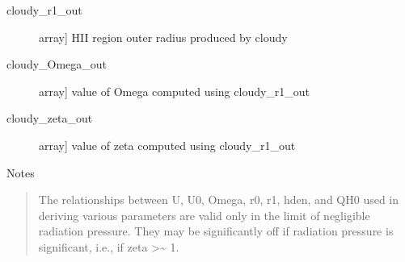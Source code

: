 \documentclass[letterpaper,10pt,english]{sphinxmanual}
\begin{document}
\begin{fulllineitems}
\begin{description}
\begin{description}
\item[{cloudy\_r1\_out}] \leavevmode{[}array{]}
HII region outer radius produced by cloudy

\item[{cloudy\_Omega\_out}] \leavevmode{[}array{]}
value of Omega computed using cloudy\_r1\_out

\item[{cloudy\_zeta\_out}] \leavevmode{[}array{]}
value of zeta computed using cloudy\_r1\_out

\end{description}

\end{description}

Notes
\begin{quote}

The relationships between U, U0, Omega, r0, r1, hden, and
QH0 used in deriving various parameters are valid only in
the limit of negligible radiation pressure. They may be
significantly off if radiation pressure is significant,
i.e., if zeta \textgreater{}\textasciitilde{} 1.
\end{quote}

\end{fulllineitems}

\end{document}
